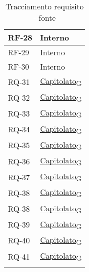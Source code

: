\begin{longtable}{|>{\centering\arraybackslash}m{}|>{\centering\arraybackslash}m{}|}
	RF-28              & Interno                                                                                                           \\\hline
	RF-29              & Interno                                                                                                           \\\hline
	RF-30              & Interno                                                                                                           \\\hline
	RQ-31              & \href{https://7last.github.io/docs/rtb/documentazione-interna/glossario\#capitolato}{Capitolato\textsubscript{G}} \\\hline
	RQ-32              & \href{https://7last.github.io/docs/rtb/documentazione-interna/glossario\#capitolato}{Capitolato\textsubscript{G}} \\\hline
	RQ-33              & \href{https://7last.github.io/docs/rtb/documentazione-interna/glossario\#capitolato}{Capitolato\textsubscript{G}} \\\hline
	RQ-34              & \href{https://7last.github.io/docs/rtb/documentazione-interna/glossario\#capitolato}{Capitolato\textsubscript{G}} \\\hline
	RQ-35              & \href{https://7last.github.io/docs/rtb/documentazione-interna/glossario\#capitolato}{Capitolato\textsubscript{G}} \\\hline
	RQ-36              & \href{https://7last.github.io/docs/rtb/documentazione-interna/glossario\#capitolato}{Capitolato\textsubscript{G}} \\\hline
	RQ-37              & \href{https://7last.github.io/docs/rtb/documentazione-interna/glossario\#capitolato}{Capitolato\textsubscript{G}} \\\hline
	RQ-38              & \href{https://7last.github.io/docs/rtb/documentazione-interna/glossario\#capitolato}{Capitolato\textsubscript{G}} \\\hline
	RQ-38              & \href{https://7last.github.io/docs/rtb/documentazione-interna/glossario\#capitolato}{Capitolato\textsubscript{G}} \\\hline
	RQ-39              & \href{https://7last.github.io/docs/rtb/documentazione-interna/glossario\#capitolato}{Capitolato\textsubscript{G}} \\\hline
	RQ-40              & \href{https://7last.github.io/docs/rtb/documentazione-interna/glossario\#capitolato}{Capitolato\textsubscript{G}} \\\hline
	RQ-41              & \href{https://7last.github.io/docs/rtb/documentazione-interna/glossario\#capitolato}{Capitolato\textsubscript{G}} \\\hline
	\caption{Tracciamento requisito - fonte}
	\label{table:4}
\end{longtable}

